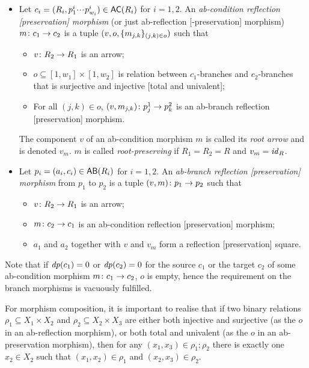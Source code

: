 \begin{definition}\label{def:ab-morphism}
\begin{itemize}[defsep]
\item Let $c_i = (R_i,p^i_1\ccdots p^i_{w_i})\in \AC{R_i}$ for $i=1,2$. An \emph{ab-condition reflection [preservation] morphism} (or just ab-reflection [-preservation] morphism) $m\colon c_1 \rightarrow c_2$ is a tuple $(v,o,\{{m_{j,k}}\}_{(j,k)\in o})$ such that
\begin{itemize}[nosep]
\item $v\colon R_2\rightarrow R_1$ is an arrow;
\item $o\subseteq [1,w_1]\times [1,w_2]$ is relation between $c_1$-branches and $c_2$-branches that is surjective and injective [total and univalent];
\item For all $(j,k)\in o$, $(v,m_{j,k})\colon p^1_j\rightarrow p^2_k$ is an ab-branch reflection [preservation] morphism.
\end{itemize}
%
The component $v$ of an ab-condition morphism $m$ is called its \emph{root arrow} and is denoted $v_m$. $m$ is called \emph{root-preserving} if $R_1=R_2=R$ and $v_m=\mathit{id}_R$.

\item Let $p_i=(a_i,c_i)\in \AB{R_i}$ for $i=1,2$. An \emph{ab-branch reflection [preservation] morphism} from $p_1$ to $p_2$ is a tuple $(v,m)\colon p_1\rightarrow p_2$ such that
\begin{itemize}[nosep]
\item $v\colon R_2\rightarrow R_1$ is an arrow;
\item $m\colon c_2\rightarrow c_1$ is an ab-condition reflection [preservation] morphism;
\item $a_1$ and $a_2$ together with $v$ and $v_m$ form a reflection [preservation] square.
\end{itemize}
\end{itemize}
\end{definition}
%
Note that if $\mathit{dp}(c_1)=0$ or $\mathit{dp}(c_2)=0$ for the source $c_1$ or the target $c_2$ of some ab-condition morphism $m\colon c_1\rightarrow c_2$, $o$ is empty, hence the requirement on the branch morphisms is vacuously fulfilled.

For morphism composition, it is important to realise that if two binary relations $\rho_1\subseteq X_1\times X_2$ and $\rho_2\subseteq X_2\times X_3$ are either both injective and surjective (as the $o$ in an ab-reflection morphism), or both total and univalent (as the $o$ in an ab-preservation morphism), then for any $(x_1,x_3)\in \rho_1;\rho_2$ there is exactly one $x_2\in X_2$ such that $(x_1,x_2)\in \rho_1$ and $(x_2,x_3)\in \rho_2$.


